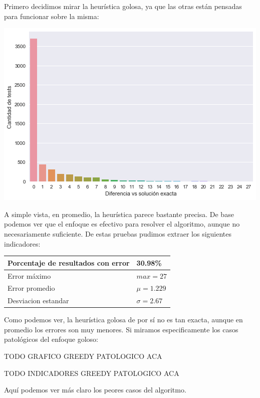 Primero decidimos mirar la heurística golosa, ya que las otras están pensadas para funcionar sobre la misma:

\begin{center}
    \includegraphics[scale=0.6]{img/accuracy-greedy.png}
\end{center}

A simple vista, en promedio, la heurística parece bastante precisa. De base podemos ver que el enfoque es efectivo para resolver el algoritmo, aunque no necesariamente suficiente. De estas pruebas pudimos extraer los siguientes indicadores:

\begin{center}
    \begin{tabular}{ | l l |}
        \hline
        Porcentaje de resultados con error & 30.98\% \\ \hline
        Error máximo & $max = 27$ \\ \hline
        Error promedio & $\mu = 1.229$ \\ \hline
        Desviacion estandar & $\sigma = 2.67$ \\
        \hline
    \end{tabular}
\end{center}

Como podemos ver, la heurística golosa de por sí no es tan exacta, aunque en promedio los errores son muy menores. Si miramos especificamente los casos patológicos del enfoque goloso:

TODO GRAFICO GREEDY PATOLOGICO ACA

TODO INDICADORES GREEDY PATOLOGICO ACA

Aquí podemos ver más claro los peores casos del algoritmo.

